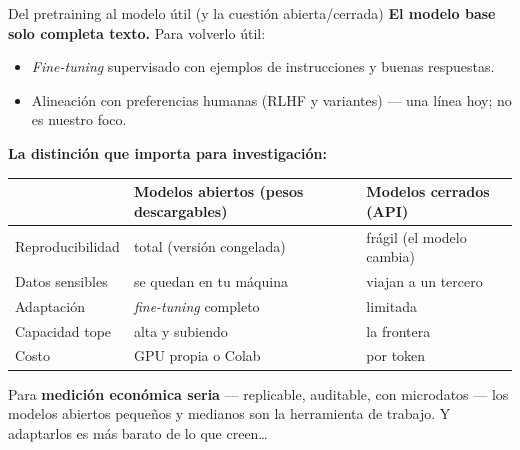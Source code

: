 \documentclass{beamer}
\newcommand{\1}{\mathbb{I}}
\begin{document}
\begin{frame}{Del pretraining al modelo útil (y la cuestión abierta/cerrada)}
\small
\textbf{El modelo base solo completa texto.} Para volverlo útil:
\begin{itemize}\itemsep4pt
  \item \emph{Fine-tuning} supervisado con ejemplos de instrucciones y buenas respuestas.
  \item Alineación con preferencias humanas (RLHF y variantes) --- una línea hoy; no es nuestro foco.
\end{itemize}
\pause

\vspace{0.15cm}
\textbf{La distinción que importa para investigación:}
\begin{center}
\footnotesize
\setlength{\tabcolsep}{4pt}
\begin{tabular}{lll}
\hline
 & Modelos \textbf{abiertos} (pesos descargables) & Modelos \textbf{cerrados} (API) \\
\hline
Reproducibilidad & total (versión congelada) & frágil (el modelo cambia) \\
Datos sensibles & se quedan en tu máquina & viajan a un tercero \\
Adaptación & \emph{fine-tuning} completo & limitada \\
Capacidad tope & alta y subiendo & la frontera \\
Costo & GPU propia o Colab & por token \\
\hline
\end{tabular}
\end{center}
\pause

\vspace{0.15cm}
Para \textbf{medición económica seria} --- replicable, auditable, con microdatos --- los modelos abiertos pequeños y medianos son la herramienta de trabajo. Y adaptarlos es más barato de lo que creen\ldots
\end{frame}
\end{document}

